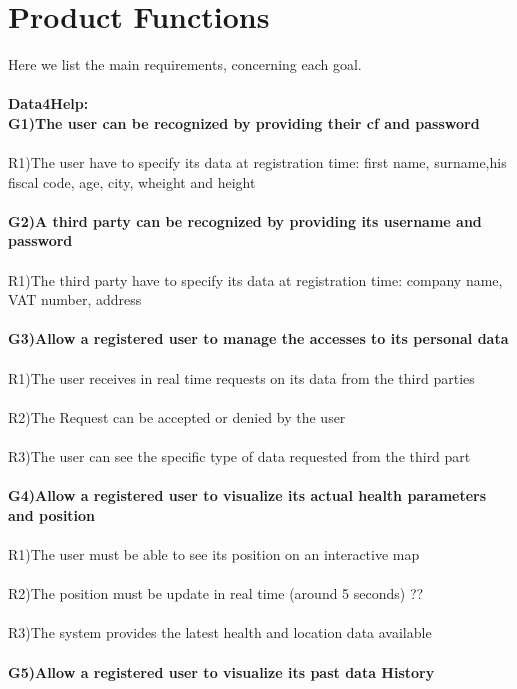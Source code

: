 \section{Product Functions}

Here we list the main requirements, concerning each goal. \\ \\

\textbf{Data4Help:} \\
\textbf{G1)The user can be recognized by providing their cf and password} \\ \\
R1)The user have to specify its data at registration time: first name, surname,his fiscal code, age, city, wheight and height\\ \\
\textbf{G2)A third party can be recognized by providing its username and password} \\ \\
R1)The third party have to specify its data at registration time: company name, VAT number, address\\ \\
\textbf{G3)Allow a registered user to manage the accesses to its personal data} \\ \\
R1)The user receives in real time requests on its data from the third parties \\ \\
R2)The Request can be accepted or denied by the user\\ \\
R3)The user can see the specific type of data requested from the third part \\ \\ 
\textbf{ G4)Allow a registered user to visualize its actual health parameters and position} \\ \\
R1)The user must be able to see its position on an interactive map \\ \\
R2)The position must be update in real time (around 5 seconds) ?? \\ \\
R3)The system provides the latest health and location data available \\ \\
\textbf{G5)Allow a registered user to visualize its past data History} \\ \\
